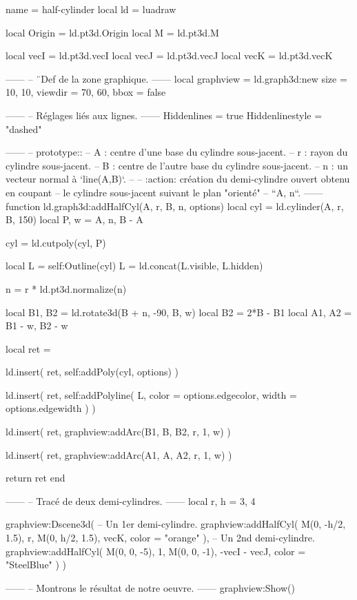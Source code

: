 \documentclass[border = 3pt]{standalone}
\begin{document}
\begin{luadraw*}{name = half-cylinder}
local ld = luadraw

local Origin = ld.pt3d.Origin
local M      = ld.pt3d.M

local vecI = ld.pt3d.vecI
local vecJ = ld.pt3d.vecJ
local vecK = ld.pt3d.vecK

------
-- ¨Def de la zone graphique.
------
local graphview = ld.graph3d:new{
  size    = {10, 10},
  viewdir = {70, 60},
  bbox    = false
}

------
-- Réglages liés aux lignes.
------
Hiddenlines     = true
Hiddenlinestyle = "dashed"

------
-- prototype::
--     A : centre d'une base du cylindre sous-jacent.
--     r : rayon du cylindre sous-jacent.
--     B : centre de l'autre base du cylindre sous-jacent.
--     n : un vecteur normal à `line(A,B)`.
--
--     :action: création du demi-cylindre ouvert obtenu en coupant
--              le cylindre sous-jacent suivant le plan "orienté"
--              ``{A, n}``.
------
function ld.graph3d:addHalfCyl(A, r, B, n, options)
  local cyl  = ld.cylinder(A, r, B, 150)
  local P, w = {A, n}, B - A

  cyl = ld.cutpoly(cyl, P)

  local L = self:Outline(cyl)
  L = ld.concat(L.visible, L.hidden)

  n = r * ld.pt3d.normalize(n)

  local B1, B2 = ld.rotate3d(B + n, -90, {B, w})
  local B2     = 2*B - B1
  local A1, A2 = B1 - w, B2 - w

  local ret = {}

  ld.insert(
    ret,
    self:addPoly(cyl, options)
  )

  ld.insert(
    ret,
    self:addPolyline(
      L,
      {
        color = options.edgecolor,
        width = options.edgewidth
      }
    )
  )

  ld.insert(
    ret,
    graphview:addArc(B1, B, B2, r, 1, w)
  )

  ld.insert(
    ret,
    graphview:addArc(A1, A, A2, r, 1, w)
  )

  return ret
end

------
-- Tracé de deux demi-cylindres.
------
local r, h = 3, 4

graphview:Dscene3d(
-- Un 1er demi-cylindre.
  graphview:addHalfCyl(
    M(0, -h/2, 1.5), r,
    M(0, h/2, 1.5), vecK,
    {color = "orange"}
  ),
-- Un 2nd demi-cylindre.
  graphview:addHalfCyl(
    M(0, 0, -5), 1,
    M(0, 0, -1), -vecI - vecJ,
    {color = "SteelBlue"}
  )
)

------
-- Montrons le résultat de notre oeuvre.
------
graphview:Show()
\end{luadraw*}
\end{document}
